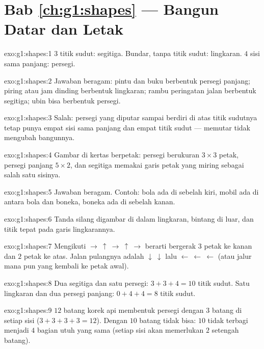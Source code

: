 \section*{Bab \ref{ch:g1:shapes} --- Bangun Datar dan Letak}

\begin{solution}{exo:g1:shapes:1}
$3$ titik sudut: segitiga. Bundar, tanpa titik sudut: lingkaran. $4$
sisi sama panjang: persegi.
\end{solution}

\begin{solution}{exo:g1:shapes:2}
Jawaban beragam: pintu dan buku berbentuk persegi panjang; piring
atau jam dinding berbentuk lingkaran; rambu peringatan jalan
berbentuk segitiga; ubin bisa berbentuk persegi.
\end{solution}

\begin{solution}{exo:g1:shapes:3}
Salah: persegi yang diputar sampai berdiri di atas titik sudutnya
tetap punya empat sisi sama panjang dan empat titik sudut ---
memutar tidak mengubah bangunnya.
\end{solution}

\begin{solution}{exo:g1:shapes:4}
Gambar di kertas berpetak: persegi berukuran $3 \times 3$ petak,
persegi panjang $5 \times 2$, dan segitiga memakai garis petak yang
miring sebagai salah satu sisinya.
\end{solution}

\begin{solution}{exo:g1:shapes:5}
Jawaban beragam. Contoh: bola ada di sebelah kiri, mobil ada di
antara bola dan boneka, boneka ada di sebelah kanan.
\end{solution}

\begin{solution}{exo:g1:shapes:6}
Tanda silang digambar di dalam lingkaran, bintang di luar, dan titik
tepat pada garis lingkarannya.
\end{solution}

\begin{solution}{exo:g1:shapes:7}
Mengikuti $\to\ \uparrow\ \to\ \uparrow\ \to$ berarti bergerak $3$
petak ke kanan dan $2$ petak ke atas. Jalan pulangnya adalah
$\downarrow\ \downarrow$ lalu $\leftarrow\ \leftarrow\ \leftarrow$
(atau jalur mana pun yang kembali ke petak awal).
\end{solution}

\begin{solution}{exo:g1:shapes:8}
Dua segitiga dan satu persegi: $3 + 3 + 4 = 10$ titik sudut. Satu
lingkaran dan dua persegi panjang: $0 + 4 + 4 = 8$ titik sudut.
\end{solution}

\begin{solution}{exo:g1:shapes:9}
$12$ batang korek api membentuk persegi dengan $3$ batang di setiap
sisi ($3 + 3 + 3 + 3 = 12$). Dengan $10$ batang tidak bisa: $10$
tidak terbagi menjadi $4$ bagian utuh yang sama (setiap sisi akan
memerlukan $2$ setengah batang).

\end{solution}
